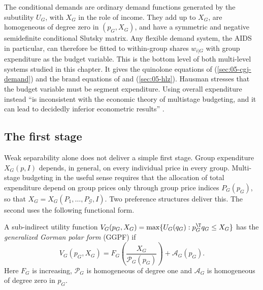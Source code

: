 The conditional demands are ordinary demand functions generated by the subutility $U_G$, with $X_G$ in
the role of income. They add up to $X_G$, are homogeneous of degree zero in $(p_G, X_G)$, and have a
symmetric and negative semidefinite conditional Slutsky matrix. Any flexible demand system, the AIDS in
particular, can therefore be fitted to within-group shares $w_{i|G}$ with group expenditure as the
budget variable. This is the bottom level of both multi-level systems studied in this chapter. It gives
the quinolone equations of \citet{ChaudhuriGoldbergJia2006} (\cref{sec:05-cgj-demand}) and the brand
equations of \citet{HausmanLeonardZona1994} and \citet{Hausman1997} (\cref{sec:05-hlz}). Hausman
stresses that the budget variable must be segment expenditure. Using overall expenditure instead ``is
inconsistent with the economic theory of multistage budgeting, and it can lead to decidedly inferior
econometric results'' \citep[p.~217]{Hausman1997}.

\subsection{The first stage}\label{sec:05-first-stage}

Weak separability alone does not deliver a simple first stage. Group expenditure $X_G(p, I)$ depends, in
general, on every individual price in every group. Multi-stage budgeting in the useful sense requires
that the allocation of total expenditure depend on group prices only through group price indices
$P_G(p_G)$, so that $X_G = X_G(P_1, \dots, P_{\mathcal{G}}, I)$. Two preference structures deliver
this. The second uses the following functional form.

\begin{definition}\label{def:05-ggpf}
A sub-indirect utility function $V_G(p_G, X_G) = \max\{U_G(q_G) : p_G^{\T}q_G \le X_G\}$ has the
\emph{generalized Gorman polar form} (GGPF) if
\begin{equation}\label{eq:05-ggpf}
  V_G(p_G, X_G) = F_G\!\left(\frac{X_G}{\mathcal{P}_G(p_G)}\right) + \mathcal{A}_G(p_G).
\end{equation}
Here $F_G$ is increasing, $\mathcal{P}_G$ is homogeneous of degree one and $\mathcal{A}_G$ is homogeneous
of degree zero in $p_G$.
\end{definition}

